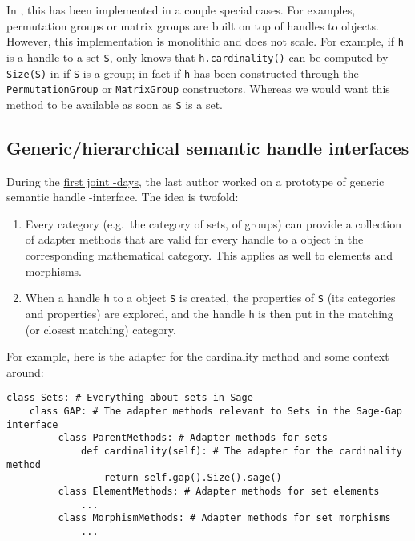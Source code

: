 In \Sage, this has been implemented in a couple special cases. For
examples, \Sage permutation groups or matrix groups are built on top
of handles to \GAP objects. However, this implementation is monolithic
and does not scale. For example, if \texttt{h} is a handle to a set
\texttt{S}, \Sage only knows that \texttt{h.cardinality()} can be
computed by \texttt{Size(S)} in \GAP if \texttt{S} is a group; in fact
if \texttt{h} has been constructed through the
\texttt{PermutationGroup} or \texttt{MatrixGroup}
constructors. Whereas we would want this method to be available as
soon as \texttt{S} is a set.

\subsection{Generic/hierarchical semantic handle interfaces}\label{generichierarchical-semantic-handle-interfaces}

During the \href{http://gapdays.de/gap-sage-days2016/}{first joint
  \GAP-\Sage days}, the last author worked on a prototype of generic
semantic handle \Sage-\GAP interface. The idea is twofold:

\begin{enumerate}
\def\labelenumi{\arabic{enumi}.}
\item Every \Sage category (e.g.~the category of sets, of groups) can
  provide a collection of adapter methods that are valid for every
  handle to a \GAP object in the corresponding mathematical category.
  This applies as well to elements and morphisms.
\item When a handle \texttt{h} to a \GAP object \texttt{S} is created,
  the properties of \texttt{S} (its \GAP categories and properties)
  are explored, and the handle \texttt{h} is then put in the matching
  (or closest matching) \Sage category.
\end{enumerate}

For example, here is the adapter for the cardinality method and some
context around:
\begin{lstlisting}
class Sets: # Everything about sets in Sage
    class GAP: # The adapter methods relevant to Sets in the Sage-Gap interface
         class ParentMethods: # Adapter methods for sets
             def cardinality(self): # The adapter for the cardinality method
                 return self.gap().Size().sage()
         class ElementMethods: # Adapter methods for set elements
             ...
         class MorphismMethods: # Adapter methods for set morphisms
             ...
\end{lstlisting}

